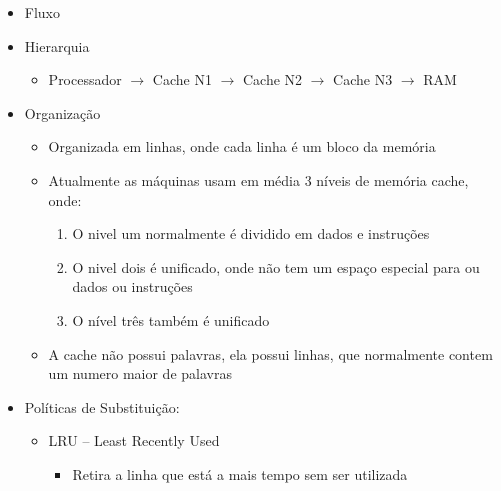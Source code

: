\documentclass[12pt]{article}
\begin{document}
\begin{itemize}
\begin{itemize}
\begin{enumerate}
        \end{enumerate}
        \item Quando o programa possui uma função JUMP, a memória cache busca 
        os dados aos arredores do endereço do JUMP, porém, não é sempre que a 
        cache acessa a memória correta
        \begin{itemize}
            \item Falha (miss) -- Quando o dado ou instrução que o processador 
            precisa não está na Cache
            \item Acerto (hit) -- Quando o dado ou instrução que o processador 
            precisa está na Cache
        \end{itemize}
    \end{itemize}
    \item Fluxo
    \item Hierarquia
    \begin{itemize}
        \item Processador $\rightarrow$ Cache N1 $\rightarrow$ Cache N2 
        $\rightarrow$ Cache N3 $\rightarrow$ RAM
    \end{itemize}
    \item Organização
    \begin{itemize}
        \item Organizada em linhas, onde cada linha é um bloco da memória
        \item Atualmente as máquinas usam em média 3 níveis de memória cache, 
        onde:
        \begin{enumerate}
            \item O nivel um normalmente é dividido em dados e instruções
            \item O nivel dois é unificado, onde não tem um espaço especial 
            para ou dados ou instruções
            \item O nível três também é unificado
        \end{enumerate}
        \item A cache não possui palavras, ela possui linhas, que normalmente 
        contem um numero maior de palavras
    \end{itemize}
    \item Políticas de Substituição:
    \begin{itemize}
        \item LRU -- Least Recently Used
        \begin{itemize}
            \item Retira a linha que está a mais tempo sem ser utilizada

\end{itemize}
\end{itemize}
\end{itemize}
\end{document}
